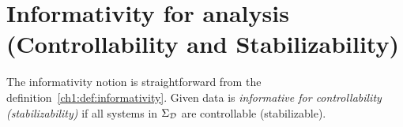 
\section{Informativity for analysis (Controllability and Stabilizability)}
The informativity notion is straightforward from the definition~\ref{ch1:def:informativity}. Given data is {\em informative for controllability (stabilizability)} if all systems in $\Sigma_{\mathcal{D}}$ are controllable (stabilizable).

